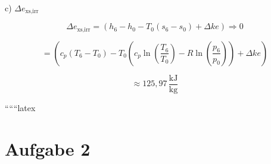 c) \(\Delta e_{\text{xs,irr}}\)

\[
\Delta e_{\text{xs,irr}} = (h_6 - h_0 - T_0 (s_6 - s_0) + \Delta ke) \Rightarrow 0
\]

\[
= \left( c_p (T_6 - T_0) - T_0 \left( c_p \ln \left( \frac{T_6}{T_0} \right) - R \ln \left( \frac{p_6}{p_0} \right) \right) + \Delta ke \right)
\]

\[
\approx 125{,}97 \, \frac{\text{kJ}}{\text{kg}}
\]

``````latex


\section*{Aufgabe 2}